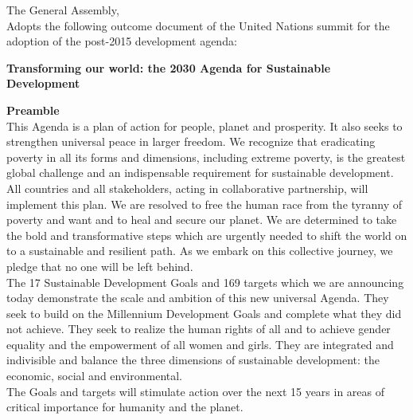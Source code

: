\setlength{\baselineskip}{15pt}
\newline
The General Assembly, %
\\%

Adopts the following outcome document of the United Nations summit for the adoption of the post-2015 development agenda:
\begin{center} %
\textbf{Transforming our world: the 2030 Agenda for Sustainable Development}
\end{center}
\newline
\textbf{Preamble}~{}\\

This Agenda is a plan of action for people, planet and prosperity. It also seeks to strengthen universal peace in larger freedom. We recognize that eradicating poverty in all its forms and dimensions, including extreme poverty, is the greatest global challenge and an indispensable requirement for sustainable development.\\

All countries and all stakeholders, acting in collaborative partnership, will implement this plan. We are resolved to free the human race from the tyranny of poverty and want and to heal and secure our planet. We are determined to take the bold and transformative steps which are urgently needed to shift the world on to a sustainable and resilient path. As we embark on this collective journey, we pledge that no one will be left behind.\\

The 17 Sustainable Development Goals and 169 targets which we are announcing today demonstrate the scale and ambition of this new universal Agenda. They seek to build on the Millennium Development Goals and complete what they did not achieve. They seek to realize the human rights of all and to achieve gender equality and the empowerment of all women and girls. They are integrated and indivisible and balance the three dimensions of sustainable development: the economic, social and environmental.\\

The Goals and targets will stimulate action over the next 15 years in areas of critical importance for humanity and the planet.
